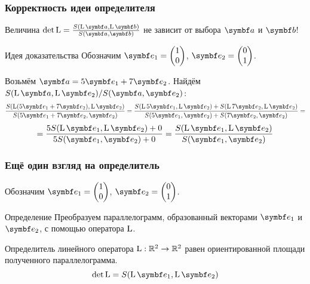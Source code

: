 \begin{frame}
    \frametitle{Корректность идеи определителя}

    Величина $\det \LL = \frac{S(\LL\ba, \LL\bb)}{S(\ba, \bb)}$ не зависит от выбора $\ba$ и $\bb$!


    \pause
    \begin{block}{Идея доказательства}
        Обозначим $\be_1 = \begin{pmatrix}
            1 \\
            0 \\
        \end{pmatrix}$, $\be_2 = \begin{pmatrix}
            0 \\
            1 \\
        \end{pmatrix}$.
        \pause

        Возьмём $\ba = 5\be_1 + 7\be_2$. Найдём $S(\LL\ba, \LL\be_2)/{S(\ba, \be_2)}$:
        \pause
        \[
        \frac{S(\LL (5\be_1 + 7\be_2), \LL \be_2)}{S(5\be_1 + 7\be_2,\be_2)} =
         \frac{S(\LL 5\be_1 , \LL \be_2) + S(\LL 7\be_2 , \LL \be_2)}{S(5\be_1,\be_2) + S(7\be_2,\be_2)} =
        \]
        \pause
        \[
         =\frac{5S(\LL \be_1 , \LL \be_2) + 0}{5S(\be_1,\be_2) + 0} =
         \frac{S(\LL \be_1 , \LL \be_2)}{S(\be_1,\be_2)}
        \]
    \end{block}

    

\end{frame}



\begin{frame}
    \frametitle{Ещё один взгляд на определитель}
    
    Обозначим $\be_1 = \begin{pmatrix}
        1 \\
        0 \\
    \end{pmatrix}$, $\be_2 = \begin{pmatrix}
        0 \\
        1 \\
    \end{pmatrix}$.

    \pause

    \begin{block}{Определение}
        Преобразуем параллелограмм, образованный векторами $\be_1$ и $\be_2$, с помощью оператора $\operatorname{L}$. 
        
        \alert{Определитель линейного оператора} $\operatorname{L}:\mathbb{R}^2 \to \mathbb{R}^2$ равен ориентированной 
        площади полученного параллелограмма.
        \[
        \det \LL = S(\LL\be_1, \LL\be_2)    
        \]
        
    \end{block}
    
\end{frame}


